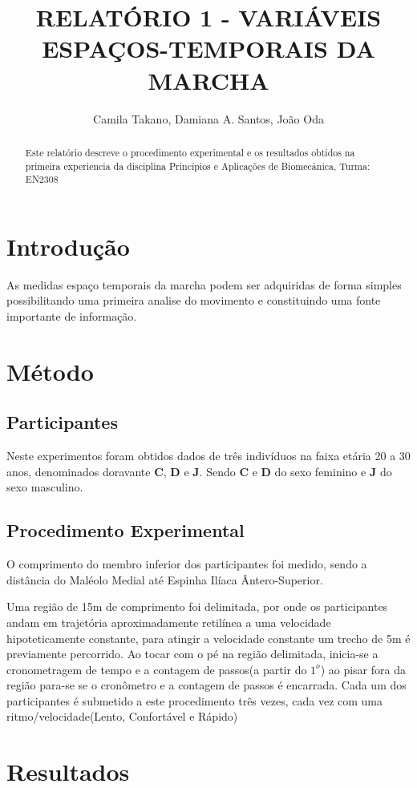 \documentclass[a4paper,10pt]{article}
\title{RELATÓRIO 1 - VARIÁVEIS ESPAÇOS-TEMPORAIS DA MARCHA}
\author{Camila Takano, Damiana A. Santos, João Oda}
\begin{document}
\maketitle

\begin{abstract}
Este relatório descreve o procedimento experimental e os resultados obtidos na primeira experiencia da disciplina Princípios e Aplicações de Biomecânica, Turma: EN2308
\end{abstract}

\section{Introdução}
As medidas espaço temporais da marcha podem ser adquiridas de forma simples possibilitando uma primeira analise do movimento e constituindo uma fonte importante de informação.

\section{Método}

\subsection{Participantes}
Neste experimentos foram obtidos dados de três indivíduos na faixa etária 20 a 30 anos, denominados doravante \textbf{C}, \textbf{D} e \textbf{J}. Sendo \textbf{C} e \textbf{D} do sexo feminino e \textbf{J} do sexo masculino. 

\subsection{Procedimento Experimental}
O comprimento do membro inferior dos participantes foi medido, sendo a distância do 
Maléolo Medial até Espinha Ilíaca Ântero-Superior.

Uma região de 15m de comprimento foi delimitada, por onde os participantes andam em trajetória aproximadamente retilínea a uma velocidade hipoteticamente constante, para atingir a velocidade constante um trecho de 5m é previamente percorrido. Ao tocar com o pé na região delimitada, inicia-se a cronometragem de tempo e a contagem de passos(a partir do $1^o$) ao pisar fora da região para-se se o cronômetro e a contagem de passos é encarrada. Cada um dos participantes é submetido a este procedimento três vezes, cada vez com uma ritmo/velocidade(Lento, Confortável e Rápido)

\section{Resultados}
\end{document}
